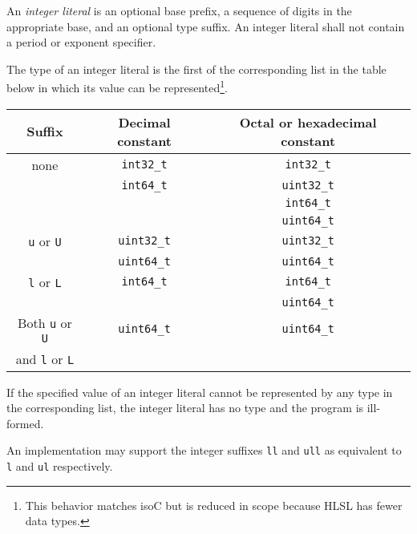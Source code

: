 \p An \textit{integer literal} is an optional base prefix, a sequence of digits
in the appropriate base, and an optional type suffix. An integer literal shall
not contain a period or exponent specifier.

\p The type of an integer literal is the first of the corresponding list in the
table below in which its value can be represented\footnote{This behavior matches
\gls{isoC} but is reduced in scope because HLSL has fewer data types.}.

\begin{center}
  \begin{tabular}{|| c | c | c ||}
    \hline
    Suffix & Decimal constant & Octal or hexadecimal constant \\
    \hline
    \hline
    none & \texttt{int32\_t} & \texttt{int32\_t} \\
         & \texttt{int64\_t} & \texttt{uint32\_t} \\
         &         & \texttt{int64\_t} \\
         &         & \texttt{uint64\_t} \\
    \hline
    \texttt{u} or \texttt{U} & \texttt{uint32\_t} & \texttt{uint32\_t} \\
                             & \texttt{uint64\_t} & \texttt{uint64\_t} \\
    \hline
    \texttt{l} or \texttt{L} & \texttt{int64\_t} & \texttt{int64\_t} \\
                             &  & \texttt{uint64\_t} \\
    \hline
    Both \texttt{u} or \texttt{U} & \texttt{uint64\_t} & \texttt{uint64\_t} \\
    and \texttt{l} or \texttt{L}  &  &  \\
    \hline
  \end{tabular}
\end{center}

\p If the specified value of an integer literal cannot be represented by any
type in the corresponding list, the integer literal has no type and the program
is ill-formed.

\p An implementation may support the integer suffixes \texttt{ll} and
\texttt{ull} as equivalent to \texttt{l} and \texttt{ul} respectively.




